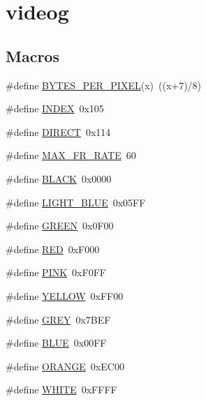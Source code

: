 \hypertarget{group__videog}{}\section{videog}
\label{group__videog}
\subsection*{Macros}
\begin{DoxyCompactItemize}
\item 
\#define \mbox{\hyperlink{group__videog_ga06ccfea6efec9fe0bd908d0b142a172d}{B\+Y\+T\+E\+S\+\_\+\+P\+E\+R\+\_\+\+P\+I\+X\+EL}}(x)~((x+7)/8)
\item 
\#define \mbox{\hyperlink{group__videog_gac6885dbfb371c33e523c7fb046118b36}{I\+N\+D\+EX}}~0x105
\item 
\#define \mbox{\hyperlink{group__videog_ga86720ded03b3f5b5ca53d30b33cb33bb}{D\+I\+R\+E\+CT}}~0x114
\item 
\#define \mbox{\hyperlink{group__videog_gac0c27ee88c2ac7437b37445026083b1f}{M\+A\+X\+\_\+\+F\+R\+\_\+\+R\+A\+TE}}~60
\item 
\#define \mbox{\hyperlink{group__videog_ga7b3b25cba33b07c303f3060fe41887f6}{B\+L\+A\+CK}}~0x0000
\item 
\#define \mbox{\hyperlink{group__videog_ga959d1249a76cfbd90fc6d96e2a9744e9}{L\+I\+G\+H\+T\+\_\+\+B\+L\+UE}}~0x05\+FF
\item 
\#define \mbox{\hyperlink{group__videog_gacfbc006ea433ad708fdee3e82996e721}{G\+R\+E\+EN}}~0x0\+F00
\item 
\#define \mbox{\hyperlink{group__videog_ga8d23feea868a983c8c2b661e1e16972f}{R\+ED}}~0x\+F000
\item 
\#define \mbox{\hyperlink{group__videog_gada419fe3b48fcf19daed7cc57ccf1174}{P\+I\+NK}}~0x\+F0\+FF
\item 
\#define \mbox{\hyperlink{group__videog_gabf681265909adf3d3e8116c93c0ba179}{Y\+E\+L\+L\+OW}}~0x\+F\+F00
\item 
\#define \mbox{\hyperlink{group__videog_gadce122f566c88a1eceeb79a635afa964}{G\+R\+EY}}~0x7\+B\+EF
\item 
\#define \mbox{\hyperlink{group__videog_ga79d10e672abb49ad63eeaa8aaef57c38}{B\+L\+UE}}~0x00\+FF
\item 
\#define \mbox{\hyperlink{group__videog_gac5b6e19bf06822021f35602c59658de3}{O\+R\+A\+N\+GE}}~0x\+E\+C00
\item 
\#define \mbox{\hyperlink{group__videog_ga87b537f5fa5c109d3c05c13d6b18f382}{W\+H\+I\+TE}}~0x\+F\+F\+FF
\end{DoxyCompactItemize}
